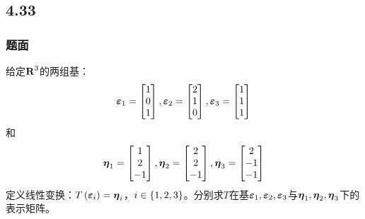 \documentclass{beamer}
\begin{document}
\subsection*{4.33}
\begin{frame}
    \frametitle{题面}
    给定\(\boldsymbol{\mathrm{R}}^3\)的两组基：
    \begin{equation*}
        \boldsymbol{\varepsilon}_1=\begin{bmatrix}1\\0\\1\end{bmatrix},
        \boldsymbol{\varepsilon}_2=\begin{bmatrix}2\\1\\0\end{bmatrix},
        \boldsymbol{\varepsilon}_3=\begin{bmatrix}1\\1\\1\end{bmatrix}
    \end{equation*}
    和
    \begin{equation*}
        \boldsymbol{\eta}_1=\begin{bmatrix}1\\2\\-1\end{bmatrix},
        \boldsymbol{\eta}_2=\begin{bmatrix}2\\2\\-1\end{bmatrix},
        \boldsymbol{\eta}_3=\begin{bmatrix}2\\-1\\-1\end{bmatrix}
    \end{equation*}
    定义线性变换：\(T\left( \boldsymbol{\varepsilon}_i \right)=\boldsymbol{\eta}_i\)，\(i\in\left\{1,2,3 \right\}\)。分别求\(T\)在基\(\boldsymbol{\varepsilon}_1,\boldsymbol{\varepsilon}_2,\boldsymbol{\varepsilon}_3\)与\(\boldsymbol{\eta}_1,\boldsymbol{\eta}_2,\boldsymbol{\eta}_3\)下的表示矩阵。
\end{frame}
\end{document}

